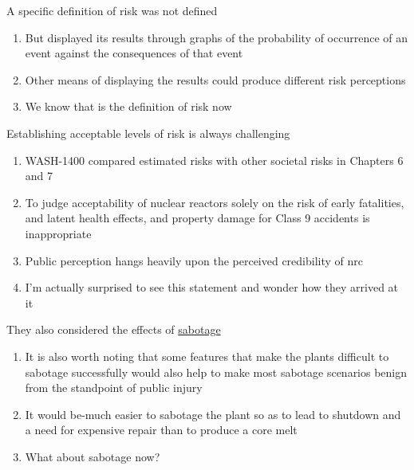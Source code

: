 \documentclass[aspectratio=1610,pdftex,dvipsnames,compress,xcolor={dvipsnames}]{beamer}
\newcommand{\acs}{\acrshort} %
\begin{document}
\begin{frame}{A specific definition of risk was not defined }
    \begin{enumerate}[series=outerlist,topsep=0pt,itemsep=21pt,leftmargin=*,label=(\arabic*)]
        \item[]But displayed its results through graphs of the probability of occurrence of an event against the consequences of that event
        \item[]Other means of displaying the results could produce different risk perceptions
        \item[]We know that is the definition of risk now
    \end{enumerate}
\end{frame}


\begin{frame}{Establishing acceptable levels of risk is always challenging}
    \begin{enumerate}[series=outerlist,topsep=0pt,itemsep=21pt,leftmargin=*,label=(\arabic*)]
        \item[]WASH-1400 compared estimated risks with other societal risks in Chapters 6 and 7
        \item[]To judge acceptability of nuclear reactors solely on the risk of early fatalities, and latent health effects, and property damage for Class 9 accidents is inappropriate
        \item[]Public perception hangs heavily upon the perceived credibility of \acs{nrc}
        \item[]I'm actually surprised to see this statement and wonder how they arrived at it
    \end{enumerate}
\end{frame}


\begin{frame}{They also considered the effects of \href{https://youtu.be/z5rRZdiu1UE}{sabotage}}
    \begin{enumerate}[series=outerlist,topsep=0pt,itemsep=21pt,leftmargin=*,label=(\arabic*)]
        \item[]It is also worth noting that some features that make the plants difficult to sabotage successfully would also help to make most sabotage scenarios benign from the standpoint of public injury
        \item[]It would be-much easier to sabotage the plant so as to lead to shutdown and a need for expensive repair than to produce a core melt
        \item[]What about sabotage now? 
    \end{enumerate}
\end{frame}
\end{document}
